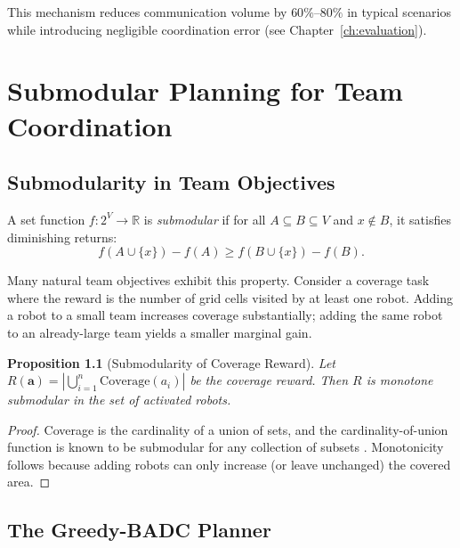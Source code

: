 \documentclass[12pt,oneside]{report}
\newtheorem{proposition}[theorem]{Proposition}
\theoremstyle{definition}
\theoremstyle{remark}
\begin{document}
This mechanism reduces communication volume by $60\%$--$80\%$ in typical
scenarios while introducing negligible coordination error (see
Chapter~\ref{ch:evaluation}).

\chapter{Submodular Planning for Team Coordination}
\label{ch:planning}

\section{Submodularity in Team Objectives}

A set function $f: 2^V \to \mathbb{R}$ is \emph{submodular} if for all
$A \subseteq B \subseteq V$ and $x \notin B$, it satisfies diminishing returns:
\begin{equation}
  f(A \cup \{x\}) - f(A) \geq f(B \cup \{x\}) - f(B).
  \label{eq:submodular}
\end{equation}

Many natural team objectives exhibit this property. Consider a coverage task
where the reward is the number of grid cells visited by at least one robot.
Adding a robot to a small team increases coverage substantially; adding the
same robot to an already-large team yields a smaller marginal gain.

\begin{proposition}[Submodularity of Coverage Reward]
  Let $R(\mathbf{a}) = |\bigcup_{i=1}^n \text{Coverage}(a_i)|$ be the coverage
  reward. Then $R$ is monotone submodular in the set of activated robots.
\end{proposition}

\begin{proof}
  Coverage is the cardinality of a union of sets, and the cardinality-of-union
  function is known to be submodular for any collection of subsets
  \citep{krause2014submodularity}. Monotonicity follows because adding robots
  can only increase (or leave unchanged) the covered area.
\end{proof}

\section{The Greedy-BADC Planner}
\end{document}
